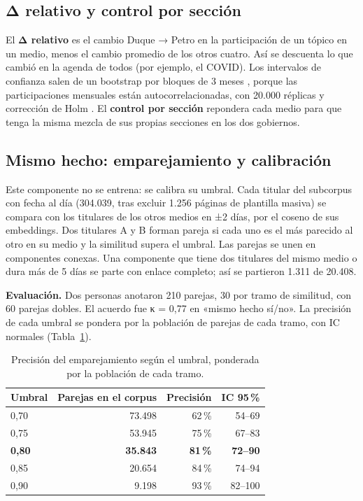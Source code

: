 \documentclass[10pt,twocolumn]{article}
\begin{document}
\subsection{Δ relativo y control por sección}\label{sec:delta}
El \textbf{Δ relativo} es el cambio Duque → Petro en la participación de un
tópico en un medio, menos el cambio promedio de los otros cuatro. Así se descuenta
lo que cambió en la agenda de todos (por ejemplo, el COVID). Los intervalos de
confianza salen de un bootstrap por bloques de 3 meses \cite{kunsch1989}, porque
las participaciones mensuales están autocorrelacionadas, con 20.000 réplicas y
corrección de Holm \cite{holm1979}. El \textbf{control por sección} repondera cada
medio para que tenga la misma mezcla de sus propias secciones en los dos
gobiernos.

\subsection{Mismo hecho: emparejamiento y calibración}
Este componente no se entrena: se calibra su umbral. Cada titular del subcorpus
con fecha al día (304.039, tras excluir 1.256 páginas de plantilla masiva) se
compara con los titulares de los otros medios en ±2 días, por el coseno de sus
embeddings. Dos titulares A y B forman pareja si cada uno es el más parecido al
otro en su medio y la similitud supera el umbral. Las parejas se unen en
componentes conexas. Una componente que tiene dos titulares del mismo medio o
dura más de 5 días se parte con enlace completo; así se partieron 1.311 de
20.408.

\textbf{Evaluación.} Dos personas anotaron 210 parejas, 30 por tramo de
similitud, con 60 parejas dobles. El acuerdo fue κ = 0,77 \cite{cohen1960} en
«mismo hecho sí/no». La precisión de cada umbral se pondera por la población de
parejas de cada tramo, con IC normales (Tabla~\ref{tab:umbral}).

\begin{table}[t]
\centering\small
\caption{Precisión del emparejamiento según el umbral, ponderada por la
población de cada tramo.}
\label{tab:umbral}
\begin{tabular}{lrrr}\toprule
Umbral & Parejas en el corpus & Precisión & IC 95\,\%\\\midrule
0,70 & 73.498 & 62\,\% & 54--69\\
0,75 & 53.945 & 75\,\% & 67--83\\
\textbf{0,80} & \textbf{35.843} & \textbf{81\,\%} & \textbf{72--90}\\
0,85 & 20.654 & 84\,\% & 74--94\\
0,90 & 9.198 & 93\,\% & 82--100\\
\bottomrule\end{tabular}
\end{table}
\end{document}
